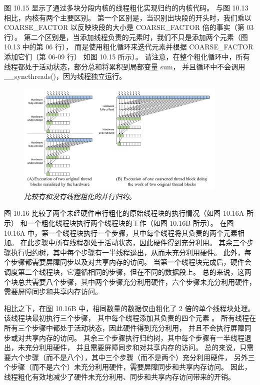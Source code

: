 图 10.15 显示了通过多块分段内核的线程粗化实现归约的内核代码。 与图 10.13 相比，内核有两个主要区别。 
第一个区别是，当识别出块段的开头时，我们乘以 COARSE\_FACTOR 以反映块段的大小是 COARSE\_FACTOR 倍的事实（第 03 行）。 
第二个区别是，当添加线程负责的元素时，我们不只是添加两个元素（图 10.13 中的第 06 行），
而是使用粗化循环来迭代元素并根据 COARSE\_FACTOR 添加它们（第 06-09 行） 如图 10.15 所示）。 
请注意，在整个粗化循环中，所有线程都处于活动状态，部分总和将累积到局部变量 sum，
并且循环中不会调用 \_\_syncthreads()，因为线程独立运行。

\begin{figure}[H]
	\centering
	\includegraphics[width=0.9\textwidth]{figs/F10.16.png}
	\caption{\textit{比较有和没有线程粗化的并行归约。}}
\end{figure}

图 10.16 比较了两个未经硬件串行粗化的原始线程块的执行情况（如图 10.16A 所示）
和一个粗化线程块执行两个线程块的工作（如图 10.16B 所示）。 
在图 10.16A 中，第一个线程块执行一个步骤，其中每个线程将其负责的两个元素相加。 
在此步骤中所有线程都处于活动状态，因此硬件得到充分利用。 
其余三个步骤执行归约树，其中每个步骤有一半线程退出，从而未充分利用硬件。 
此外，每个步骤都需要屏障同步以及对共享内存的访问。 
当第一个线程块完成后，硬件会调度第二个线程块，它遵循相同的步骤，但在不同的数据段上。 
总的来说，这两个块总共需要八个步骤，其中两个步骤充分利用硬件，六个步骤未充分利用硬件，需要屏障同步和共享内存访问。

相比之下，在图 10.16B 中，相同数量的数据仅由粗化了 2 倍的单个线程块处理。该线程块最初执行三个步骤，
其中每个线程添加其负责的四个元素 。 所有线程在所有三个步骤中都处于活动状态，因此硬件得到充分利用，
并且不会执行屏障同步或对共享内存的访问。 其余三个步骤执行归约树，其中每个步骤有一半线程退出，未充分利用硬件，
并且需要屏障同步和对共享内存的访问。 总的来说，只需要六个步骤（而不是八个），其中三个步骤（而不是两个）充分利用硬件，
另外三个步骤（而不是六个）未充分利用硬件，需要屏障同步和共享内存访问。 
因此，线程粗化有效地减少了硬件未充分利用、同步和共享内存访问带来的开销。

